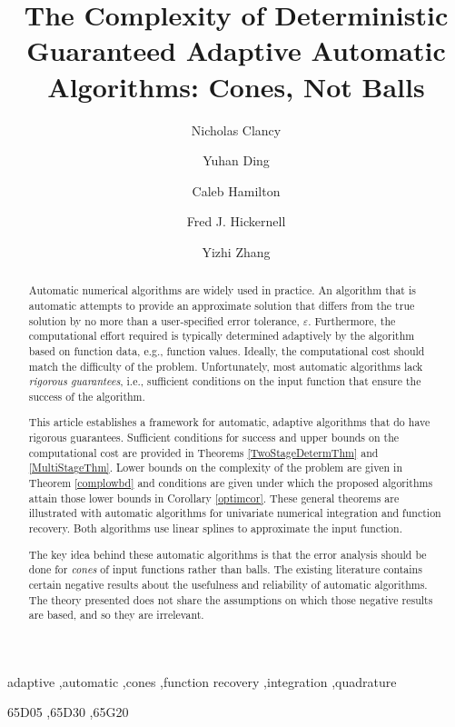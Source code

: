 \documentclass[]{elsarticle}
\theoremstyle{definition}
\theoremstyle{remark}
\begin{document}
\begin{frontmatter}

\title{The Complexity of Deterministic Guaranteed Adaptive Automatic Algorithms:  Cones, Not Balls}
\author{Nicholas Clancy}
\author{Yuhan Ding}
\author{Caleb Hamilton}
\author{Fred J. Hickernell}
\author{Yizhi Zhang}
\address{Room E1-208, Department of Applied Mathematics, Illinois Institute of Technology,\\ 10 W.\ 32$^{\text{nd}}$ St., Chicago, IL 60616}
\begin{abstract} Automatic numerical algorithms are widely used in practice.  An algorithm that is automatic attempts to provide an approximate solution that differs from the true solution by no more than a user-specified error tolerance, $\varepsilon$. Furthermore, the computational effort required is typically determined adaptively by the algorithm based on function data, e.g., function values.  Ideally, the computational cost should match the difficulty of the problem.  Unfortunately, most automatic algorithms lack \emph{rigorous guarantees}, i.e., sufficient conditions on the input function that ensure the success of the algorithm. 

This article establishes a framework for automatic, adaptive algorithms that do have rigorous guarantees. Sufficient conditions for success and upper bounds on the computational cost are provided in Theorems \ref{TwoStageDetermThm} and \ref{MultiStageThm}.  Lower bounds on the complexity of the problem are given in Theorem \ref{complowbd} and conditions are given under which the proposed algorithms attain those lower bounds in Corollary \ref{optimcor}. These general theorems are illustrated with automatic algorithms for univariate numerical integration and function recovery.  Both algorithms use linear splines to approximate the input function.  

The key idea behind these automatic algorithms is that the error analysis should be done for \emph{cones} of input functions rather than balls. The existing literature contains certain negative results about the usefulness and reliability of automatic algorithms.  The theory presented does not share the assumptions on which those negative results are based, and so they are irrelevant.
\end{abstract}

\begin{keyword}
adaptive \sep automatic \sep cones \sep function recovery \sep integration \sep quadrature

\MSC[2010] 65D05 \sep 65D30 \sep 65G20

\end{keyword}
\end{frontmatter}
\end{document}
